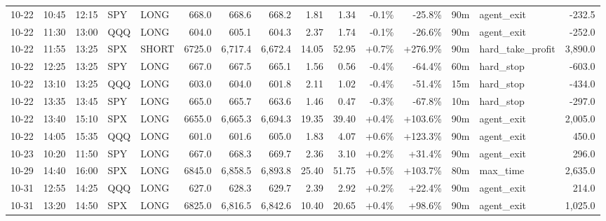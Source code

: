 \documentclass[11pt,a4paper,twoside]{article}
\begin{document}
\begin{landscape}
\begin{center}
\begin{longtable}{>{\color{txtmain}}l l l l l r r r r r r r r >{\color{txtmain}}l r}
10-22 & 10:45 & 12:15 & SPY & LONG & 668.0 & 668.6 & 668.2 & 1.81 & 1.34 & \textcolor{lossred}{-0.1\%} & \textcolor{lossred}{-25.8\%} & 90m & agent\_exit & \textcolor{lossred}{-232.5} \\
10-22 & 11:30 & 13:00 & QQQ & LONG & 604.0 & 605.1 & 604.3 & 2.37 & 1.74 & \textcolor{lossred}{-0.1\%} & \textcolor{lossred}{-26.6\%} & 90m & agent\_exit & \textcolor{lossred}{-252.0} \\
10-22 & 11:55 & 13:25 & SPX & SHORT & 6725.0 & 6,717.4 & 6,672.4 & 14.05 & 52.95 & \textcolor{wingreen}{+0.7\%} & \textcolor{wingreen}{+276.9\%} & 90m & hard\_take\_profit & \textcolor{wingreen}{3,890.0} \\
10-22 & 12:25 & 13:25 & SPY & LONG & 667.0 & 667.5 & 665.1 & 1.56 & 0.56 & \textcolor{lossred}{-0.4\%} & \textcolor{lossred}{-64.4\%} & 60m & hard\_stop & \textcolor{lossred}{-603.0} \\
10-22 & 13:10 & 13:25 & QQQ & LONG & 603.0 & 604.0 & 601.8 & 2.11 & 1.02 & \textcolor{lossred}{-0.4\%} & \textcolor{lossred}{-51.4\%} & 15m & hard\_stop & \textcolor{lossred}{-434.0} \\
10-22 & 13:35 & 13:45 & SPY & LONG & 665.0 & 665.7 & 663.6 & 1.46 & 0.47 & \textcolor{lossred}{-0.3\%} & \textcolor{lossred}{-67.8\%} & 10m & hard\_stop & \textcolor{lossred}{-297.0} \\
10-22 & 13:40 & 15:10 & SPX & LONG & 6655.0 & 6,665.3 & 6,694.3 & 19.35 & 39.40 & \textcolor{wingreen}{+0.4\%} & \textcolor{wingreen}{+103.6\%} & 90m & agent\_exit & \textcolor{wingreen}{2,005.0} \\
10-22 & 14:05 & 15:35 & QQQ & LONG & 601.0 & 601.6 & 605.0 & 1.83 & 4.07 & \textcolor{wingreen}{+0.6\%} & \textcolor{wingreen}{+123.3\%} & 90m & agent\_exit & \textcolor{wingreen}{450.0} \\
10-23 & 10:20 & 11:50 & SPY & LONG & 667.0 & 668.3 & 669.7 & 2.36 & 3.10 & \textcolor{wingreen}{+0.2\%} & \textcolor{wingreen}{+31.4\%} & 90m & agent\_exit & \textcolor{wingreen}{296.0} \\
10-29 & 14:40 & 16:00 & SPX & LONG & 6845.0 & 6,858.5 & 6,893.8 & 25.40 & 51.75 & \textcolor{wingreen}{+0.5\%} & \textcolor{wingreen}{+103.7\%} & 80m & max\_time & \textcolor{wingreen}{2,635.0} \\
10-31 & 12:55 & 14:25 & QQQ & LONG & 627.0 & 628.3 & 629.7 & 2.39 & 2.92 & \textcolor{wingreen}{+0.2\%} & \textcolor{wingreen}{+22.4\%} & 90m & agent\_exit & \textcolor{wingreen}{214.0} \\
10-31 & 13:20 & 14:50 & SPX & LONG & 6825.0 & 6,816.5 & 6,842.6 & 10.40 & 20.65 & \textcolor{wingreen}{+0.4\%} & \textcolor{wingreen}{+98.6\%} & 90m & agent\_exit & \textcolor{wingreen}{1,025.0} \\

\end{longtable}
\end{center}
\end{landscape}
\end{document}
